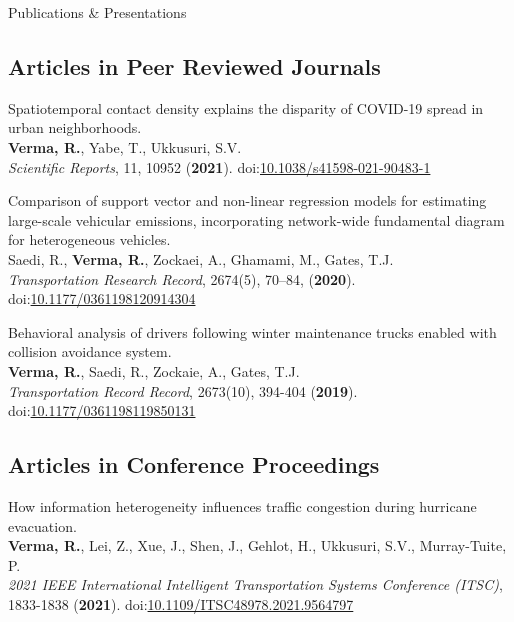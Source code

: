\documentclass{resume} %
\begin{document}
    \begin{rSection}{Publications \& Presentations}
        \subsection*{Articles in Peer Reviewed Journals}
        \begin{etaremune}
            \item Spatiotemporal contact density explains the disparity of COVID-19 spread in urban neighborhoods.
            \\ \textbf{Verma, R.}, Yabe, T., Ukkusuri, S.V.
            \\ \textit{Scientific Reports}, 11, 10952 (\textbf{2021}). doi:\href{https://www.nature.com/articles/s41598-021-90483-1}{10.1038/s41598-021-90483-1}

            \item Comparison of support vector and non-linear regression models for estimating large-scale vehicular emissions, incorporating network-wide fundamental diagram for heterogeneous vehicles.
            \\ Saedi, R., \textbf{Verma, R.}, Zockaei, A., Ghamami, M., Gates, T.J.
            \\ \textit{Transportation Research Record}, 2674(5), 70–84, (\textbf{2020}). doi:\href{https://journals.sagepub.com/doi/abs/10.1177/0361198120914304}{10.1177/0361198120914304}

            \item Behavioral analysis of drivers following winter maintenance trucks enabled with collision avoidance system.
            \\ \textbf{Verma, R.}, Saedi, R., Zockaie, A., Gates, T.J.
            \\ \textit{Transportation Record Record}, 2673(10), 394-404 (\textbf{2019}). doi:\href{https://journals.sagepub.com/doi/abs/10.1177/0361198119850131}{10.1177/0361198119850131}
        \end{etaremune}

        \subsection*{Articles in Conference Proceedings}
        \begin{etaremune}
            \item How information heterogeneity influences traffic congestion during hurricane evacuation.
            \\ \textbf{Verma, R.}, Lei, Z., Xue, J., Shen, J., Gehlot, H., Ukkusuri, S.V., Murray-Tuite, P.
            \\ \textit{2021 IEEE International Intelligent Transportation Systems Conference (ITSC)}, 1833-1838 (\textbf{2021}). doi:\href{https://ieeexplore.ieee.org/document/9564797}{10.1109/ITSC48978.2021.9564797}


\end{etaremune}
\end{rSection}
\end{document}
